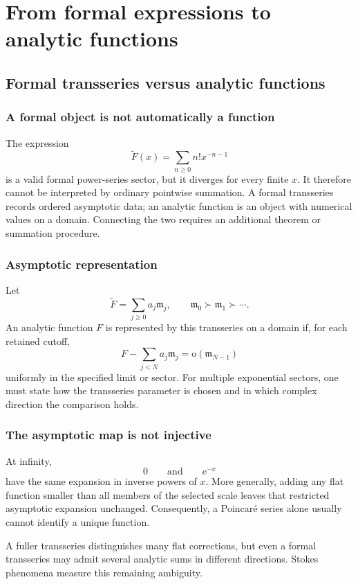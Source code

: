 \documentclass[11pt,openany]{book}
\theoremstyle{plain}
\theoremstyle{definition}
\theoremstyle{remark}
\newcommand{\m}{\mathfrak{m}}
\newcommand{\smallo}{\mathrm{o}}
\newcommand{\e}{\mathrm{e}}
\begin{document}
\part{From formal expressions to analytic functions}

\chapter{Formal transseries versus analytic functions}
\label{chap:formal-analytic}

\section{A formal object is not automatically a function}
The expression
\[
  \widetilde F(x)=\sum_{n\ge0}n!x^{-n-1}
\]
is a valid formal power-series sector, but it diverges for every finite $x$. It therefore cannot be interpreted by ordinary pointwise summation. A formal transseries records ordered asymptotic data; an analytic function is an object with numerical values on a domain. Connecting the two requires an additional theorem or summation procedure.

\section{Asymptotic representation}
Let
\[
  \widetilde F=\sum_{j\ge0}a_j\m_j,
  \qquad
  \m_0\succ\m_1\succ\cdots.
\]
An analytic function $F$ is represented by this transseries on a domain if, for each retained cutoff,
\[
  F-\sum_{j<N}a_j\m_j
  =\smallo(\m_{N-1})
\]
uniformly in the specified limit or sector. For multiple exponential sectors, one must state how the transseries parameter is chosen and in which complex direction the comparison holds.

\section{The asymptotic map is not injective}
At infinity,
\[
  0
  \qquad\text{and}\qquad
  \e^{-x}
\]
have the same expansion in inverse powers of $x$. More generally, adding any flat function smaller than all members of the selected scale leaves that restricted asymptotic expansion unchanged. Consequently, a Poincar\'e series alone usually cannot identify a unique function.

A fuller transseries distinguishes many flat corrections, but even a formal transseries may admit several analytic sums in different directions. Stokes phenomena measure this remaining ambiguity.
\end{document}
